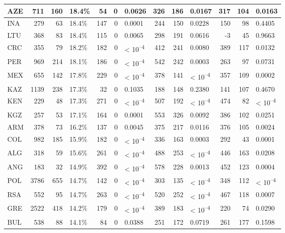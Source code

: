 \begin{tabular}{l|r|r|l|r|r|l|r|r|l|r|r|l}
\hline
AZE & 711 & 160 & 18.4\% & 54 & 0 & 0.0626 & 326 & 186 & 0.0167 & 317 & 104 & 0.0163\\
\hline
INA & 279 & 63 & 18.4\% & 147 & 0 & 0.0001 & 244 & 150 & 0.0228 & 150 & 98 & 0.4405\\
\hline
LTU & 368 & 83 & 18.4\% & 115 & 0 & 0.0065 & 298 & 191 & 0.0616 & -3 & 45 & 0.9663\\
\hline
CRC & 355 & 79 & 18.2\% & 182 & 0 & < 10\textsuperscript{--4} & 412 & 241 & 0.0080 & 389 & 117 & 0.0132\\
\hline
PER & 969 & 214 & 18.1\% & 186 & 0 & < 10\textsuperscript{--4} & 542 & 242 & 0.0003 & 263 & 97 & 0.0731\\
\hline
MEX & 655 & 142 & 17.8\% & 229 & 0 & < 10\textsuperscript{--4} & 378 & 141 & < 10\textsuperscript{--4} & 357 & 109 & 0.0002\\
\hline
KAZ & 1139 & 238 & 17.3\% & 32 & 0 & 0.1035 & 188 & 148 & 0.2380 & 141 & 107 & 0.4670\\
\hline
KEN & 229 & 48 & 17.3\% & 271 & 0 & < 10\textsuperscript{--4} & 507 & 192 & < 10\textsuperscript{--4} & 474 & 82 & < 10\textsuperscript{--4}\\
\hline
KGZ & 257 & 53 & 17.1\% & 164 & 0 & 0.0001 & 553 & 326 & 0.0092 & 386 & 102 & 0.0251\\
\hline
ARM & 378 & 73 & 16.2\% & 137 & 0 & 0.0045 & 375 & 217 & 0.0116 & 376 & 105 & 0.0024\\
\hline
COL & 982 & 185 & 15.9\% & 182 & 0 & < 10\textsuperscript{--4} & 336 & 163 & 0.0003 & 292 & 43 & 0.0001\\
\hline
ALG & 318 & 59 & 15.6\% & 261 & 0 & < 10\textsuperscript{--4} & 488 & 253 & < 10\textsuperscript{--4} & 446 & 163 & 0.0208\\
\hline
ANG & 183 & 32 & 14.9\% & 392 & 0 & < 10\textsuperscript{--4} & 578 & 228 & 0.0013 & 452 & 123 & 0.0004\\
\hline
POL & 3786 & 655 & 14.7\% & 142 & 0 & < 10\textsuperscript{--4} & 303 & 135 & < 10\textsuperscript{--4} & 348 & 112 & < 10\textsuperscript{--4}\\
\hline
RSA & 552 & 95 & 14.7\% & 263 & 0 & < 10\textsuperscript{--4} & 520 & 252 & < 10\textsuperscript{--4} & 467 & 118 & 0.0007\\
\hline
GRE & 2522 & 418 & 14.2\% & 179 & 0 & < 10\textsuperscript{--4} & 389 & 183 & < 10\textsuperscript{--4} & 220 & 74 & 0.0290\\
\hline
BUL & 538 & 88 & 14.1\% & 84 & 0 & 0.0388 & 251 & 172 & 0.0719 & 261 & 177 & 0.1598\\

\end{tabular}

